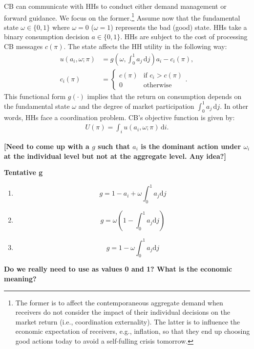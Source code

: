 \documentclass[12pt,a4paper]{article}
\begin{document}
CB can communicate with HHs to conduct either demand management or forward guidance. We focus on the former.\footnote{The former is to affect the contemporaneous aggregate demand when receivers do not consider the impact of their individual decisions on the market return (i.e., coordination externality). The latter is to influence the economic expectation of receivers, e.g., inflation, so that they end up choosing good actions today to avoid a self-fulling crisis tomorrow.} Assume now that the fundamental state $\omega \in \{0,1\}$ where $\omega=0$ ($\omega=1$) represents the bad (good) state. HHs take a binary consumption decision $a \in \{0,1\}$. HHs are subject to the cost of processing CB messages $c(\pi)$. The state affects the HH utility in the following way:
\begin{align}
    u(a_i,\omega;\pi) & = g\left(\omega,\int_0^1 a_j \, \mbox{d}j \right) a_i - c_i(\pi), \\
    c_i(\pi) & = \left\{\begin{array}{ll}
        c(\pi)   &  \mbox{if } c_i > c(\pi) \\
        0        &  \mbox{otherwise}
        \end{array}\right..
\end{align}
This functional form $g(\cdot)$ implies that the return on consumption depends on the fundamental state $\omega$ and the degree of market participation $\int_0^1 a_j \, \mbox{d}j$. In other words, HHs face a coordination problem. CB's objective function is given by:
\begin{align}
    U(\pi) = \int_i u(a_i,\omega; \pi) \, \mbox{d}i.
\end{align}

\textbf{[Need to come up with a $g$ such that $a_i$ is the dominant action under $\omega_i$ at the individual level but not at the aggregate level. Any idea?]}

\textbf{Tentative g}
\begin{enumerate}
    \item $$g=1-a_i+\omega\int_{0}^{1}a_j\mathrm{d}j$$ %
    \item $$g=\omega\left(1-\int_{0}^{1}a_j\mathrm{d}j\right)$$ %
    \item $$g=1-\omega\int_{0}^{1}a_j\mathrm{d}j$$ %
\end{enumerate}

\textbf{Do we really need to use as values 0 and 1? What is the economic meaning?}

\newpage


\end{document}
